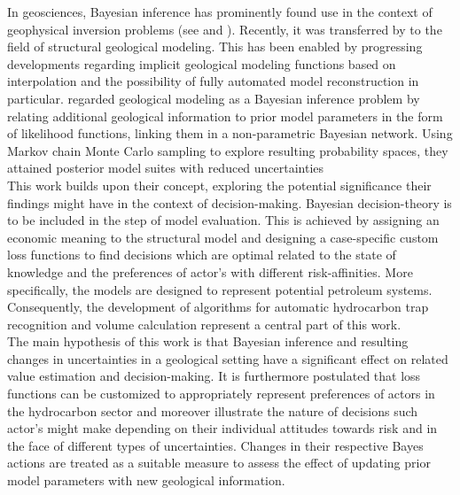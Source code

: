 In geosciences, Bayesian inference has prominently found use in the context of geophysical inversion problems (see \citet{tarantola1982inverse, mosegaard2002probabilistic} and \citet{sambridge2002monte}). Recently, it was transferred by \citet{delaVarga2016} to the field of structural geological modeling. This has been enabled by progressing developments regarding implicit geological modeling functions based on interpolation \citep{hillier2014three, mallet1992discrete, lajaunie1997foliation} and the possibility of fully automated model reconstruction in particular.  \citet{delaVarga2016} regarded geological modeling as a Bayesian inference problem by relating additional geological information to prior model parameters in the form of likelihood functions, linking them in a non-parametric Bayesian network. Using Markov chain Monte Carlo sampling to explore resulting probability spaces, they attained posterior model suites with reduced uncertainties \citep{delaVarga2016}\\
This work builds upon their concept, exploring the potential significance their findings might have in the context of decision-making. Bayesian decision-theory is to be included in the step of model evaluation. This is achieved by assigning an economic meaning to the structural model and designing a case-specific custom loss functions to find decisions which are optimal related to the state of knowledge and the preferences of actor's with different risk-affinities. More specifically, the models are designed to represent potential petroleum systems. Consequently, the development of algorithms for automatic hydrocarbon trap recognition and volume calculation represent a central part of this work.\\
The main hypothesis of this work is that Bayesian inference and resulting changes in uncertainties in a geological setting have a significant effect on related value estimation and decision-making. It is furthermore postulated that loss functions can be customized to appropriately represent preferences of actors in the hydrocarbon sector and moreover illustrate the nature of decisions such actor's might make depending on their individual attitudes towards risk and in the face of different types of uncertainties. Changes in their respective Bayes actions are treated as a suitable measure to assess the effect of updating prior model parameters with new geological information.